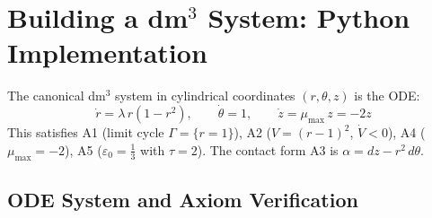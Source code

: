 \documentclass[11pt, a4paper]{article}
\theoremstyle{definition}
\newcommand{\Gam}{\Gamma}
\newcommand{\mumax}{\mu_{\max}}
\newcommand{\EPS}{\varepsilon_0}
\begin{document}
\section{Building a dm$^3$ System: Python Implementation}
\label{sec:python}

The canonical dm$^3$ system in cylindrical coordinates $(r, \theta, z)$ is the ODE:
\begin{equation}
  \dot{r} = \lambda\, r(1-r^2),\qquad
  \dot{\theta} = 1,\qquad
  \dot{z} = \mumax\, z = -2z
  \label{eq:canon-ode}
\end{equation}
This satisfies A1 (limit cycle $\Gam = \{r=1\}$), A2 ($V=(r-1)^2$, $\dot{V}<0$),
A4 ($\mumax = -2$), A5 ($\EPS = \tfrac{1}{3}$ with $\tau = 2$).
The contact form A3 is $\alpha = dz - r^2\,d\theta$.

\subsection{ODE System and Axiom Verification}
\end{document}
